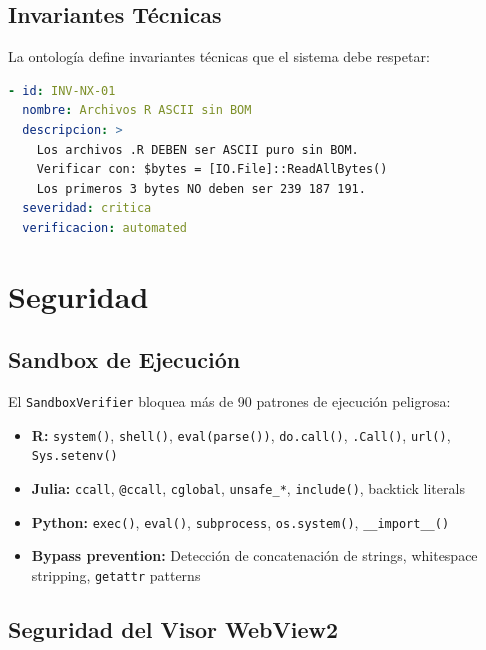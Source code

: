 \documentclass[12pt, a4paper]{report}
\begin{document}
\section{Invariantes Técnicas}

La ontología define invariantes técnicas que el sistema debe respetar:

\begin{lstlisting}[language=yaml, caption={Ejemplo de invariante en ontología YAML}]
- id: INV-NX-01
  nombre: Archivos R ASCII sin BOM
  descripcion: >
    Los archivos .R DEBEN ser ASCII puro sin BOM.
    Verificar con: $bytes = [IO.File]::ReadAllBytes()
    Los primeros 3 bytes NO deben ser 239 187 191.
  severidad: critica
  verificacion: automated
\end{lstlisting}

\chapter{Seguridad}

\section{Sandbox de Ejecución}

El \texttt{SandboxVerifier} bloquea más de 90 patrones de ejecución peligrosa:

\begin{itemize}
    \item \textbf{R:} \texttt{system()}, \texttt{shell()}, \texttt{eval(parse())}, \texttt{do.call()}, \texttt{.Call()}, \texttt{url()}, \texttt{Sys.setenv()}
    \item \textbf{Julia:} \texttt{ccall}, \texttt{@ccall}, \texttt{cglobal}, \texttt{unsafe\_*}, \texttt{include()}, backtick literals
    \item \textbf{Python:} \texttt{exec()}, \texttt{eval()}, \texttt{subprocess}, \texttt{os.system()}, \texttt{\_\_import\_\_()}
    \item \textbf{Bypass prevention:} Detección de concatenación de strings, whitespace stripping, \texttt{getattr} patterns
\end{itemize}

\section{Seguridad del Visor WebView2}
\end{document}
